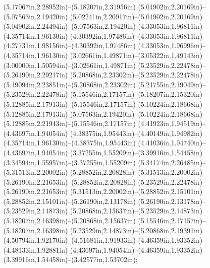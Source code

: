 (5.17067in,2.28952in)--(5.18207in,2.31956in) (5.04902in,2.20169in)--(5.07563in,2.19420in) (5.02241in,2.20917in)--(5.04902in,2.20169in) (5.04902in,2.24494in)--(5.07563in,2.19420in) (4.33053in,1.96811in)--(4.35714in,1.96130in) (4.30392in,1.97486in)--(4.33053in,1.96811in) (4.27731in,1.98156in)--(4.30392in,1.97486in) (4.33053in,1.96996in)--(4.35714in,1.96130in) (3.02661in,1.49871in)--(3.05322in,1.49143in) (3.00000in,1.50594in)--(3.02661in,1.49871in) (5.23529in,2.22478in)--(5.26190in,2.29217in) (5.20868in,2.23302in)--(5.23529in,2.22478in) (5.19094in,2.23851in)--(5.20868in,2.23302in) (5.21755in,2.19049in)--(5.23529in,2.22478in) (5.15546in,2.17157in)--(5.18207in,2.15320in) (5.12885in,2.17913in)--(5.15546in,2.17157in) (5.10224in,2.18668in)--(5.12885in,2.17913in) (5.07563in,2.19420in)--(5.10224in,2.18668in) (5.12885in,2.21943in)--(5.15546in,2.17157in) (4.41923in,1.94519in)--(4.43697in,1.94054in) (4.38375in,1.95443in)--(4.40149in,1.94982in) (4.35714in,1.96130in)--(4.38375in,1.95443in) (4.41036in,1.94740in)--(4.43697in,1.94054in) (3.37255in,1.55209in)--(3.39916in,1.54458in) (3.34594in,1.55957in)--(3.37255in,1.55209in) (5.34174in,2.26485in)--(5.31513in,2.20002in) (5.28852in,2.20828in)--(5.31513in,2.20002in) (5.26190in,2.21653in)--(5.28852in,2.20828in) (5.23529in,2.22478in)--(5.26190in,2.21653in) (5.31513in,2.20002in)--(5.28852in,2.15101in) (5.28852in,2.15101in)--(5.26190in,2.13178in) (5.26190in,2.13178in)--(5.23529in,2.14873in) (5.20868in,2.15637in)--(5.23529in,2.14873in) (5.18207in,2.16398in)--(5.20868in,2.15637in) (5.15546in,2.17157in)--(5.18207in,2.16398in) (5.23529in,2.14873in)--(5.20868in,2.19391in) (4.50794in,1.92170in)--(4.51681in,1.91933in) (4.46359in,1.93352in)--(4.48133in,1.92881in) (4.43697in,1.94054in)--(4.46359in,1.93352in) (3.39916in,1.54458in)--(3.42577in,1.53702in);
